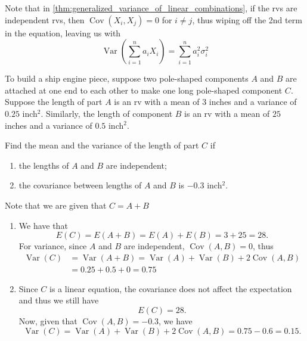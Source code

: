 \documentclass[notoc,notitlepage]{tufte-book}
\DeclareMathOperator{\Var}{Var }
\DeclareMathOperator{\Cov}{Cov }
\begin{document}
\begin{note}
  Note that in \cref{thm:generalized_variance_of_linear_combinations}, if the rvs are independent rvs, then $\Cov(X_i, X_j) = 0$ for $i \neq j$, thus wiping off the 2nd term in the equation, leaving us with
  \begin{equation*}
    \Var \left( \sum_{i=1}^{n} a_i X_i \right) = \sum_{i=1}^{n} a_i^2 \sigma_i^2
  \end{equation*}
\end{note}

\begin{eg}[Example 3.19]
  To build a ship engine piece, suppose two pole-shaped components $A$ and $B$ are attached at one end to each other to make one long pole-shaped component $C$. Suppose the length of part $A$ is an rv with a mean of $3$ inches and a variance of $0.25$ inch$^2$. Similarly, the length of component $B$ is an rv with a mean of $25$ inches and a variance of $0.5$ inch$^2$.

  Find the mean and the variance of the length of part $C$ if
  \begin{enumerate}
    \item the lengths of $A$ and $B$ are independent;
    \item the covariance between lengths of $A$ and $B$ is $-0.3$ inch$^2$.
  \end{enumerate}
\end{eg}

\begin{solution}
  Note that we are given that $C = A + B$
  \begin{enumerate}
    \item We have that
      \begin{equation*}
        E(C) = E(A + B) = E(A) + E(B) = 3 + 25 = 28.
      \end{equation*}
      For variance, since $A$ and $B$ are independent, $\Cov(A, B) = 0$, thus
      \begin{align*}
        \Var(C) &= \Var(A + B) = \Var(A) + \Var(B) + 2 \Cov(A, B) \\
          &= 0.25 + 0.5 + 0 = 0.75
      \end{align*}

    \item Since $C$ is a linear equation, the covariance does not affect the expectation and thus we still have
    \begin{equation*}
      E(C) = 28.
    \end{equation*}
    Now, given that $\Cov(A, B) = -0.3$, we have
    \begin{equation*}
      \Var(C) = \Var(A) + \Var(B) + 2 \Cov(A, B) = 0.75 - 0.6 = 0.15.
    \end{equation*}
  \end{enumerate}
\end{solution}
\end{document}
